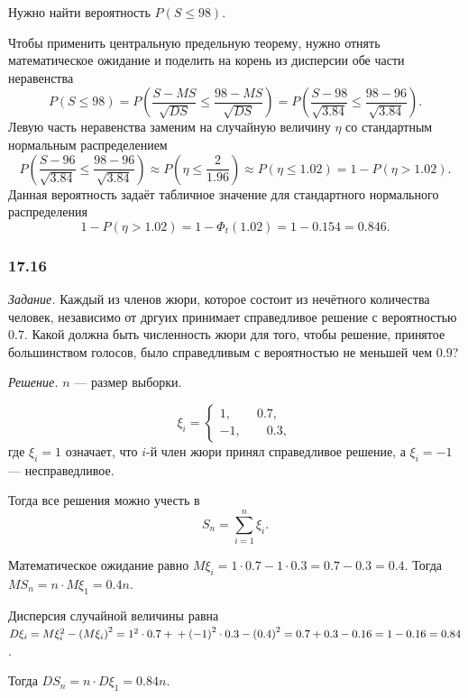 Нужно найти вероятность $P \left( S \leq 98 \right)$.

Чтобы применить центральную предельную теорему,
нужно отнять математическое ожидание и поделить на корень из дисперсии обе части неравенства
$$P \left( S \leq 98 \right) =
  P \left( \frac{S - MS}{ \sqrt{DS}} \leq \frac{98 - MS}{ \sqrt{DS}} \right) =
  P \left( \frac{S - 98}{ \sqrt{3.84}} \leq \frac{98 - 96}{ \sqrt{3.84}} \right).$$
Левую часть неравенства заменим на случайную величину $ \eta $
со стандартным нормальным распределением
$$P \left( \frac{S - 96}{ \sqrt{3.84}} \leq \frac{98 - 96}{ \sqrt{3.84}} \right) \approx
  P \left( \eta \leq \frac{2}{1.96} \right) \approx
  P \left( \eta \leq 1.02 \right) =
  1 - P \left( \eta > 1.02 \right).$$
Данная вероятность задаёт табличное значение для стандартного нормального распределения
$$1 - P \left( \eta > 1.02 \right) =
  1 - \Phi_t \left( 1.02 \right) =
  1 - 0.154 =
  0.846.$$

\subsubsection*{17.16}

\textit{Задание.} Каждый из членов жюри, которое состоит из нечётного количества человек,
независимо от дргуих принимает справедливое решение с вероятностью $0.7$.
Какой должна быть численность жюри для того, чтобы решение, принятое большинством голосов,
было справедливым с вероятностью не меньшей чем $0.9$?

\textit{Решение.} $n$ --- размер выборки.

$$ \xi_i =
  \begin{cases}
    1, \qquad 0.7, \\
    -1, \qquad 0.3,
  \end{cases}$$
где $ \xi_i = 1$ означает, что $i$-й член жюри принял справедливое решение,
а $ \xi_i = -1$ --- несправедливое.

Тогда все решения можно учесть в
$$S_n =
  \sum \limits_{i = 1}^n \xi_i.$$

Математическое ожидание равно $M \xi_i = 1 \cdot 0.7 -1 \cdot 0.3 = 0.7 - 0.3 = 0.4$.
Тогда $MS_n = n \cdot M \xi_1 = 0.4n$.

Дисперсия случайной величины равна
$D \xi_i =
  M \xi_i^2 - \left( M \xi_i \right)^2 =
  1^2 \cdot 0.7 + \\
  + \left( -1 \right)^2 \cdot 0.3 - \left( 0.4 \right)^2 =
  0.7 + 0.3 - 0.16 =
  1 - 0.16 =
  0.84$.

Тогда $DS_n = n \cdot D \xi_1 = 0.84n$.

